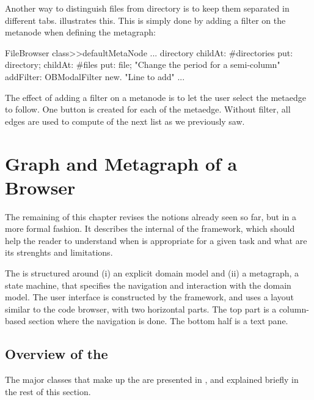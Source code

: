 \documentclass[a4paper,10pt,twoside]{book}
\begin{document}
Another way to distinguish files from directory is to keep them separated in different tabs. 
 illustrates this. This is simply done by adding a filter on the  metanode when defining the metagraph:

\begin{code}{}
FileBrowser class>>defaultMetaNode
    ...
    directory 
          childAt: #directories put: directory;
          childAt: #files put: file; 		   "Change the period for a semi-column"
	addFilter: OBModalFilter new.	 "Line to add"
    ...    
\end{code}

The effect of adding a filter on a metanode is to let the user select the metaedge to follow. One button is created for each of the metaedge. Without filter, all edges are used to compute of the next list as we previously saw.

\section{Graph and Metagraph of a Browser} \label{sec:omnibrowser}

The remaining of this chapter revises the notions already seen so far, but in a more formal fashion. It describes the internal of the framework, which should help the reader to understand when \ob is appropriate for a given task and what are its strenghts and limitations.

The \obf is structured around (i) an explicit domain model and (ii) a metagraph, a state machine, that specifies the navigation and interaction with the domain model. The user interface is constructed by the framework, and uses a layout similar to the code browser, with two horizontal parts. The top part is a column-based section where the navigation is done. The bottom half is a text pane.


\subsection{Overview of the \obf}\label{sec:overview}
The major classes that make up the \obf are presented in , and explained briefly in the rest of this section. %
\end{document}
